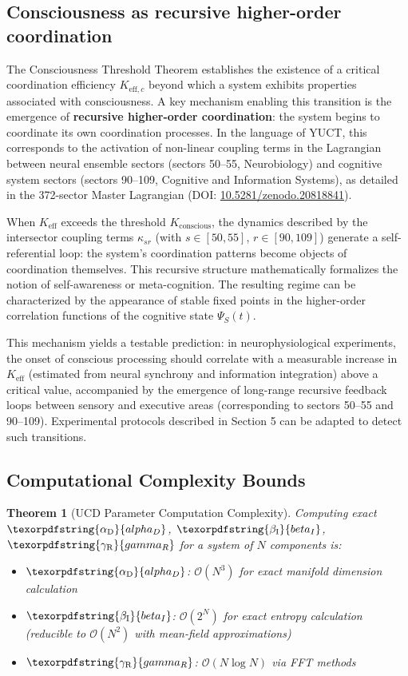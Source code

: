 \documentclass[12pt,a4paper]{article}
\newtheorem{theorem}{Theorem}
\DeclareRobustCommand{\alD}{\texorpdfstring{\ensuremath{\alpha_{\mathrm{D}}}}{alpha_D}}
\DeclareRobustCommand{\beI}{\texorpdfstring{\ensuremath{\beta_{\mathrm{I}}}}{beta_I}}
\DeclareRobustCommand{\gaR}{\texorpdfstring{\ensuremath{\gamma_{\mathrm{R}}}}{gamma_R}}
\newcommand{\eff}{\mathrm{eff}}
\begin{document}
	\subsection{Consciousness as recursive higher-order coordination}
	\label{subsec:recursive-coordination}
	
	The Consciousness Threshold Theorem establishes the existence of a critical coordination efficiency \(K_{\eff,c}\) beyond which a system exhibits properties associated with consciousness. A key mechanism enabling this transition is the emergence of \textbf{recursive higher-order coordination}: the system begins to coordinate its own coordination processes. In the language of YUCT, this corresponds to the activation of non-linear coupling terms in the Lagrangian between neural ensemble sectors (sectors 50--55, Neurobiology) and cognitive system sectors (sectors 90--109, Cognitive and Information Systems), as detailed in the 372-sector Master Lagrangian (DOI: \href{https://doi.org/10.5281/zenodo.20818841}{10.5281/zenodo.20818841}).
	
	When \(K_{\eff}\) exceeds the threshold \(K_{\mathrm{conscious}}\), the dynamics described by the intersector coupling terms \(\kappa_{sr}\) (with \(s\in[50,55]\), \(r\in[90,109]\)) generate a self-referential loop: the system's coordination patterns become objects of coordination themselves. This recursive structure mathematically formalizes the notion of self-awareness or meta-cognition. The resulting regime can be characterized by the appearance of stable fixed points in the higher-order correlation functions of the cognitive state \(\Psi_S(t)\).
	
	This mechanism yields a testable prediction: in neurophysiological experiments, the onset of conscious processing should correlate with a measurable increase in \(K_{\eff}\) (estimated from neural synchrony and information integration) above a critical value, accompanied by the emergence of long-range recursive feedback loops between sensory and executive areas (corresponding to sectors 50--55 and 90--109). Experimental protocols described in Section 5 can be adapted to detect such transitions.
	
	\subsection{Computational Complexity Bounds}
	
	\begin{theorem}[UCD Parameter Computation Complexity]
		Computing exact \(\alD\), \(\beI\), \(\gaR\) for a system of \(N\) components is:
		\begin{itemize}
			\item \(\alD\): \(\mathcal{O}(N^3)\) for exact manifold dimension calculation
			\item \(\beI\): \(\mathcal{O}(2^N)\) for exact entropy calculation (reducible to \(\mathcal{O}(N^2)\) with mean-field approximations)
			\item \(\gaR\): \(\mathcal{O}(N \log N)\) via FFT methods
		\end{itemize}
	\end{theorem}
	
\end{document}
